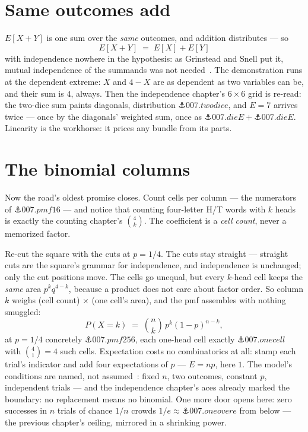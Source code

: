 \begin{narrative}
\section{Same outcomes add}

$E[X+Y]$ is one sum over the \emph{same} outcomes, and addition
distributes — so
\[
  E[X + Y] \;=\; E[X] + E[Y]
\]
with independence nowhere in the hypothesis: as Grinstead and Snell
put it, mutual independence of the summands was not
needed~\cite{probability-grinstead-snell-introduction-to-probability-6-1-libretexts}.
The demonstration runs at the dependent extreme: $X$ and $4 - X$ are
as dependent as two variables can be, and their sum is $4$, always.
Then the independence chapter's $6 \times 6$ grid is re-read: the
two-dice sum paints diagonals, distribution
$\anchor{007.twodice}$, and $E = 7$ arrives twice — once by the
diagonals' weighted sum, once as
$\anchor{007.dieE} + \anchor{007.dieE}$. Linearity is the workhorse:
it prices any bundle from its parts.

\section{The binomial columns}

Now the road's oldest promise closes. Count cells per column — the
numerators of $\anchor{007.pmf16}$ — and notice that counting
four-letter H/T words with $k$ heads is exactly the counting
chapter's $\binom{4}{k}$. The coefficient is a \emph{cell count},
never a memorized factor.

Re-cut the square with the cuts at $p = 1/4$. The cuts stay straight
— straight cuts are the square's grammar for independence, and
independence is unchanged; only the cut positions move. The cells go
unequal, but every $k$-head cell keeps the \emph{same} area
$p^k q^{4-k}$, because a product does not care about factor order. So
column $k$ weighs (cell count) $\times$ (one cell's area), and the
pmf assembles with nothing smuggled:
\[
  P(X = k) \;=\; \binom{n}{k}\, p^k (1-p)^{n-k} ,
\]
at $p = 1/4$ concretely $\anchor{007.pmf256}$, each one-head cell
exactly $\anchor{007.onecell}$ with $\binom{4}{1} = 4$ such cells.
Expectation costs no combinatorics at all: stamp each trial's
indicator and add four expectations of $p$ — $E = np$, here $1$. The
model's conditions are named, not assumed~\cite{probability-illowsky-dean-openstax-introductory-statistics-2e-4-3}:
fixed $n$, two outcomes, constant $p$, independent trials — and the
independence chapter's aces already marked the boundary: no
replacement means no binomial. One more door opens here: zero
successes in $n$ trials of chance $1/n$ crowds
$1/e \approx \anchor{007.oneovere}$ from below — the previous
chapter's ceiling, mirrored in a shrinking power.


\end{narrative}
